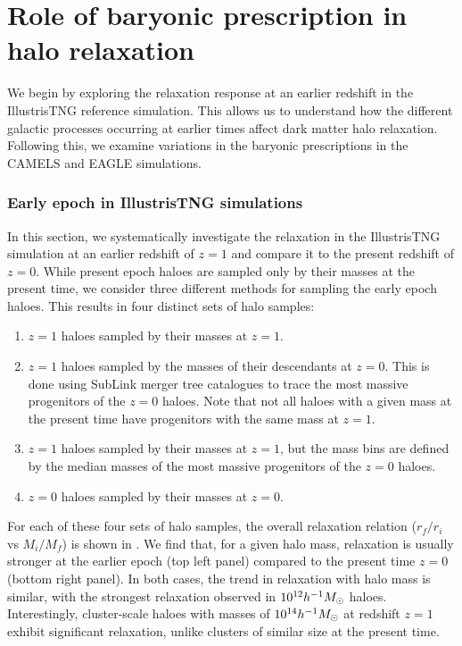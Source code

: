 \chapter{Role of baryonic prescription in halo relaxation}
\label{chap:physvar_z01}

We begin by exploring the relaxation response at an earlier redshift in the IllustrisTNG reference simulation. This allows us to understand how the different galactic processes occurring at earlier times affect dark matter halo relaxation. Following this, we examine variations in the baryonic prescriptions in the CAMELS and EAGLE simulations.

\subsection{Early epoch in IllustrisTNG simulations}
\label{sec:res-itng-z01}
In this section, we systematically investigate the relaxation in the IllustrisTNG simulation at an earlier redshift of $z = 1$ and compare it to the present redshift of $z = 0$. While present epoch haloes are sampled only by their masses at the present time, we consider three different methods for sampling the early epoch haloes. This results in four distinct sets of halo samples:

\begin{enumerate}
\item $z=1$ haloes sampled by their masses at $z=1$.
\item $z=1$ haloes sampled by the masses of their descendants at $z=0$. This is done using SubLink merger tree catalogues to trace the most massive progenitors of the $z=0$ haloes. Note that not all haloes with a given mass at the present time have progenitors with the same mass at $z=1$.
\item $z=1$ haloes sampled by their masses at $z=1$, but the mass bins are defined by the median masses of the most massive progenitors of the $z=0$ haloes.
\item $z=0$ haloes sampled by their masses at $z=0$.
\end{enumerate}

For each of these four sets of halo samples, the overall relaxation relation ($r_f/r_i$ vs $M_i/M_f$) is shown in . We find that, for a given halo mass, relaxation is usually stronger at the earlier epoch (top left panel) compared to the present time $z=0$ (bottom right panel). In both cases, the trend in relaxation with halo mass is similar, with the strongest relaxation observed in $10^{12} h^{-1}M_{\odot}$ haloes. Interestingly, cluster-scale haloes with masses of $10^{14} h^{-1}M_{\odot}$ at redshift $z=1$ exhibit significant relaxation, unlike clusters of similar size at the present time.

